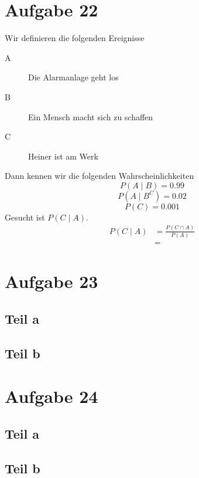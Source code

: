 \documentclass[10pt,a4paper]{article}
\begin{document}
\section{Aufgabe 22}
Wir definieren die folgenden Ereignisse
\begin{description}
\item[A] Die Alarmanlage geht los
\item[B] Ein Mensch macht sich zu schaffen
\item[C] Heiner ist am Werk
\end{description}
Dann kennen wir die folgenden Wahrscheinlichkeiten
\begin{equation}
  P(A \mid B) = 0.99
\end{equation}
\begin{equation}
  P(A \mid B^{C}) = 0.02
\end{equation}
\begin{equation}
  P(C) = 0.001
\end{equation}
Gesucht ist $P(C \mid A)$.
\begin{align*}
  P(C \mid A) & = \frac{P(C \cap A)}{P(A)}\\
  & =
\end{align*}

\section{Aufgabe 23}

\subsection{Teil a}

\subsection{Teil b}

\section{Aufgabe 24}

\subsection{Teil a}


\subsection{Teil b}
\end{document}
